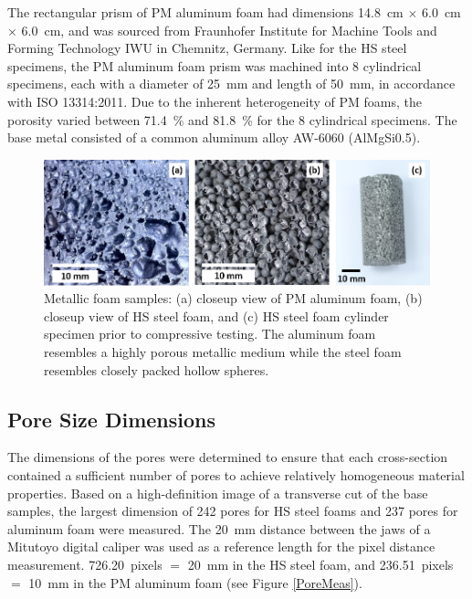 \documentclass[review]{elsarticle}
\begin{document}
The rectangular prism of PM aluminum foam had dimensions 14.8~cm $\times$ 6.0~cm $\times$ 6.0~cm, and was sourced from Fraunhofer Institute for Machine Tools and Forming Technology IWU in Chemnitz, Germany. Like for the HS steel specimens, the PM aluminum foam prism was machined into 8 cylindrical specimens, each with a diameter of 25~mm and length of 50~mm, in accordance with ISO 13314:2011. Due to the inherent heterogeneity of PM foams, the porosity varied between 71.4~\% and 81.8~\% for the 8 cylindrical specimens. The base metal consisted of a common aluminum alloy AW-6060 (AlMgSi0.5).

\begin{figure}[htbp]
	\begin{center}
		\includegraphics[width=0.95\linewidth]{Tex-Figures/Fig01a_b_c.png}
		\caption{Metallic foam samples: (a) closeup view of PM aluminum foam, (b) closeup view of HS steel foam, and (c) HS steel foam cylinder specimen prior to compressive testing. The aluminum foam resembles a highly porous metallic medium while the steel foam resembles closely packed hollow spheres.}
		\label{Samples}
	\end{center}
\end{figure}

\subsection*{Pore Size Dimensions}

The dimensions of the pores were determined to ensure that each cross-section contained a sufficient number of pores to achieve relatively homogeneous material properties. Based on a high-definition image of a transverse cut of the base samples, the largest dimension of 242 pores for HS steel foams and 237 pores for aluminum foam were measured. The 20~mm distance between the jaws of a Mitutoyo digital caliper was used as a reference length for the pixel distance measurement. 726.20~pixels $=$ 20~mm in the HS steel foam, and 236.51~pixels $=$ 10~mm in the PM aluminum foam (see Figure \ref{PoreMeas}).
\end{document}
